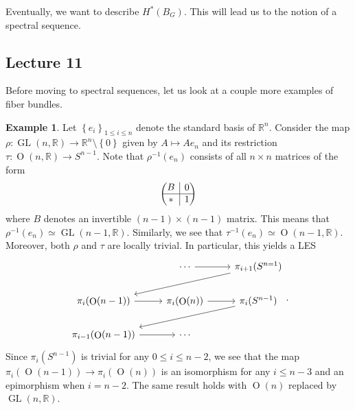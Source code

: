 \documentclass[10pt,letterpaper,cm]{nupset}
\theoremstyle{definition}
\newtheorem{exmp}[defn]{Example}
\theoremstyle{theorem}
\theoremstyle{remark}
\newcommand{\R}{\mathbb{R}}
\newcommand{\1}{\mathbb{1}}
\newcommand{\0}{\vec 0}
\DeclareMathOperator{\GL}{GL}
\DeclareMathOperator{\Or}{O}
\newcommand{\rvline}{\hspace*{-\arraycolsep}\vline\hspace*{-\arraycolsep}}
\begin{document}
Eventually, we want to describe $H^{\ast}\left(B_G\right)$. This will lead us to the notion of a spectral sequence. 

\subsection{Lecture 11}

Before moving to spectral sequences, let us look at a couple more examples of fiber bundles.

\begin{exmp}
Let $\left\{e_i\right\}_{1\leq i \leq n}$ denote the standard basis of $\R^n$.  Consider the map $\rho : \GL(n, \R) \to \R^n\setminus \left\{0\right\}$ given by $A \mapsto A{e_n}$ and its restriction $\tau : \Or(n, \R) \to S^{n-1}$.
Note that $\rho^{-1}(e_n)$ consists of all $n\times n$ matrices of the form 
\[
\begin{pmatrix}
  \begin{matrix}
 B
  \end{matrix}
  & \rvline & 0 \\
\hline
  \ast & \rvline &
  \begin{matrix}
 1
  \end{matrix}
\end{pmatrix}
\]
where $B$ denotes an invertible $\left(n-1\right) \times \left(n-1\right)$ matrix. This means that $\rho^{-1}(e_n) \simeq \GL(n-1, \R)$. Similarly, we see that $\tau^{-1}(e_n)\simeq \Or(n-1, \R)$. Moreover, both $\rho$ and $\tau$ are locally trivial. In particular, this yields a LES
\[
\begin{tikzcd}
                              & \cdots \arrow[r]        & \pi_{i+1}(S^{n=1}) \arrow[lld] \\
\pi_i(\Or(n-1)) \arrow[r]     & \pi_i(\Or(n)) \arrow[r] & \pi_i(S^{n-1}) \arrow[lld]     \\
\pi_{i-1}(\Or(n-1)) \arrow[r] & \cdots                  &                               
\end{tikzcd}.
\]
Since $\pi_i(S^{n-1})$ is trivial for any $0 \leq i \leq n-2$, we see that the map $\pi_i(\Or(n-1)) \to \pi_i(\Or(n))$ is an isomorphism for any $i\leq n-3$ and an epimorphism when $i=n-2$. The same result holds with $\Or(n)$ replaced by $\GL(n,\R)$.
\end{exmp}
\end{document}

